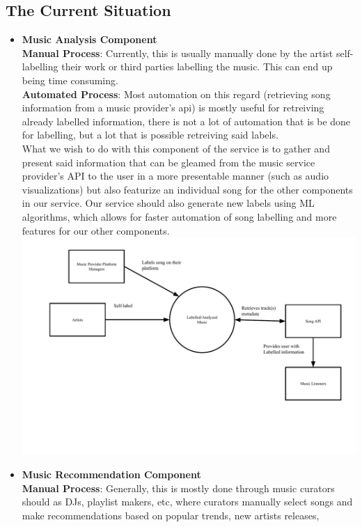 \documentclass[12pt]{article}
\begin{document}
\subsection{The Current Situation}
\begin{itemize}
  \item \textbf{Music Analysis Component}
  \\\textbf{Manual Process}: Currently, this is usually manually done by the artist self-labelling their work
  or third parties labelling the music. This can end up being time consuming. 
  \\\textbf{Automated Process}: Most automation on this regard (retrieving song information from a music 
  provider's api) is mostly useful for retreiving already labelled information, there is not a lot of automation 
  that is be done for labelling, but a lot that is possible retreiving said labels. 
  \\What we wish to do with this component of the service is to gather and present said information that can be
  gleamed from the music service provider's API to the user in a more presentable manner (such as audio visualizations)
   but also featurize an individual song for the other components in our service. Our service should also generate new
   labels using ML algorithms, which allows for faster automation of song labelling and more features for our other 
   components. 
  \\\includegraphics[width=\textwidth]{6_1_b.pdf}
  \item \textbf{Music Recommendation Component}
  \\\textbf{Manual Process}: Generally, this is mostly done through music curators should as DJs, playlist makers,
  etc, where curators manually select songs and make recommendations based on popular trends, new artists releases,

\end{itemize}
\end{document}
